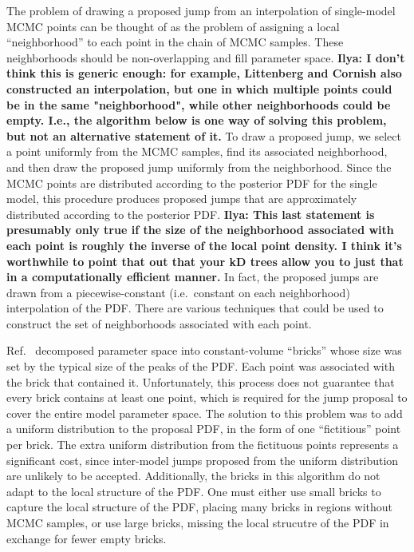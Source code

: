 \documentclass[prd,preprint]{revtex4}
\newcommand{\ilya}[1]{{\color{red} \bf Ilya: #1}}
\begin{document}
The problem of drawing a proposed jump from an interpolation of
single-model MCMC points can be thought of as the problem of assigning
a local ``neighborhood'' to each point in the chain of MCMC samples.
These neighborhoods should be non-overlapping and fill parameter
space.  \ilya{I don't think this is generic enough: for example, Littenberg and Cornish also constructed an interpolation, but one in which multiple points could be in the same "neighborhood", while other neighborhoods could be empty. I.e., the algorithm below is one way of solving this problem, but not an alternative statement of it.}
To draw a proposed jump, we select a point uniformly from the
MCMC samples, find its associated neighborhood, and then draw the
proposed jump uniformly from the neighborhood.  Since the MCMC points
are distributed according to the posterior PDF for the single model,
this procedure produces proposed jumps that are approximately
distributed according to the posterior PDF. \ilya{This last statement is presumably only true if the size of the neighborhood associated with each point is roughly the inverse of the local point density.  I think it's worthwhile to point that out that your kD trees allow you to just that in a computationally efficient manner.}  In fact, the proposed
jumps are drawn from a piecewise-constant (i.e.\ constant on each
neighborhood) interpolation of the PDF.  There are various techniques
that could be used to construct the set of neighborhoods associated
with each point.

Ref.~\cite{Littenberg2009} decomposed parameter space into
constant-volume ``bricks'' whose size was set by the typical size of
the peaks of the PDF.  Each point was associated with the brick that
contained it.  Unfortunately, this process does not guarantee that
every brick contains at least one point, which is required for the
jump proposal to cover the entire model parameter space.  The solution
to this problem was to add a uniform distribution to the proposal PDF,
in the form of one ``fictitious'' point per brick.  The extra uniform
distribution from the fictituous points represents a significant cost,
since inter-model jumps proposed from the uniform distribution are
unlikely to be accepted.  Additionally, the bricks in this algorithm
do not adapt to the local structure of the PDF.  One must either use
small bricks to capture the local structure of the PDF, placing many
bricks in regions without MCMC samples, or use large bricks, missing
the local strucutre of the PDF in exchange for fewer empty bricks.
\end{document}
